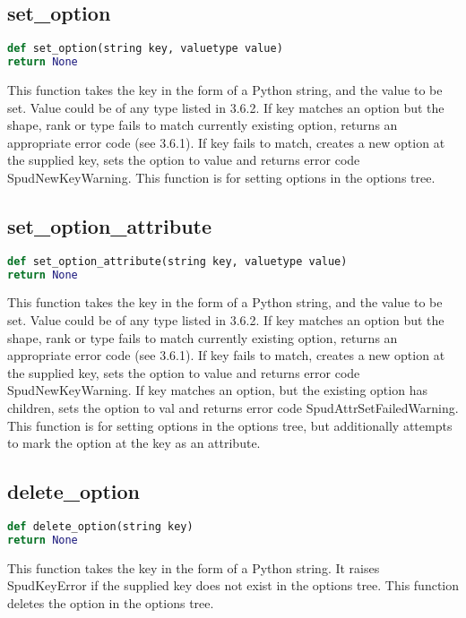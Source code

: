 \documentclass[a4paper, 11pt]{book}
\begin{document}
\subsection{set\_option}

\begin{lstlisting}[language=Python]
def set_option(string key, valuetype value)
return None
\end{lstlisting}

This function takes the key in the form of a Python string, and the value to be set.
Value could be of any type listed in 3.6.2.
If key matches an option but the shape, rank or type fails to match currently existing option,
returns an appropriate error code (see 3.6.1).
If key fails to match, creates a new option at the supplied key, sets the option to value and returns
error code SpudNewKeyWarning.
This function is for setting options in the options tree.

\subsection{set\_option\_attribute}

\begin{lstlisting}[language=Python]
def set_option_attribute(string key, valuetype value)
return None
\end{lstlisting}

This function takes the key in the form of a Python string, and the value to be set.
Value could be of any type listed in 3.6.2.
If key matches an option but the shape, rank or type fails to match currently existing option,
returns an appropriate error code (see 3.6.1).
If key fails to match, creates a new option at the supplied key, sets the option to value and returns
error code SpudNewKeyWarning.
If key matches an option, but the existing option has children, sets the option to val and
returns error code SpudAttrSetFailedWarning.
This function is for setting options in the options tree, but additionally attempts to mark the option at the key as an attribute.

\subsection{delete\_option}

\begin{lstlisting}[language=Python]
def delete_option(string key)
return None
\end{lstlisting}

This function takes the key in the form of a Python string.
It raises SpudKeyError if the supplied key does not exist in the options tree.
This function deletes the option in the options tree.
\end{document}
